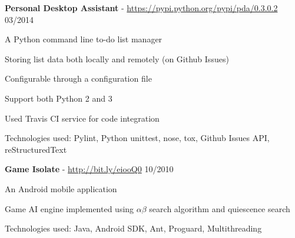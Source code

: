 \documentclass[margin,line]{resume}
\begin{document}
\begin{resume}

    \textbf{Personal Desktop Assistant} - \url{https://pypi.python.org/pypi/pda/0.3.0.2} \hfill 03/2014 \vspace{-3mm}\\\vspace{-1mm}%
      \begin{list2}
       \item A Python command line to-do list manager
       \item Storing list data both locally and remotely (on Github Issues)
       \item Configurable through a configuration file
       \item Support both Python 2 and 3
       \item Used Travis CI service for code integration
       \item Technologies used: Pylint, Python unittest, nose, tox, Github Issues API, reStructuredText
      \end{list2}

    \textbf{Game Isolate} - \url{http://bit.ly/eiooQ0} \hfill 10/2010 \vspace{-3mm}\\\vspace{-1mm}%
      \begin{list2}
       \item An Android mobile application
       \item Game AI engine implemented using $\alpha \beta$ search algorithm and quiescence search
       \item Technologies used: Java, Android SDK, Ant, Proguard, Multithreading
      \end{list2}

\end{resume}
\end{document}
